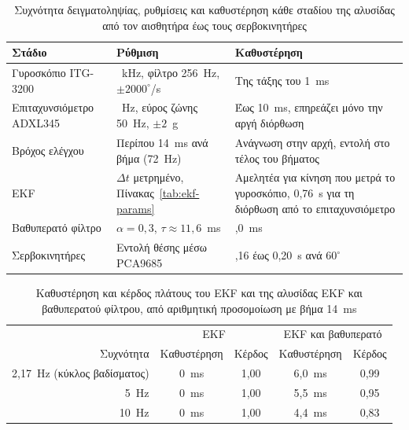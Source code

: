\documentclass[11pt]{report}
\begin{document}
\begin{table}[htbp]
    \centering
    \small
    \begin{tabular}{@{}>{\raggedright\arraybackslash}p{3.0cm}
                        >{\raggedright\arraybackslash}p{5.4cm}
                        >{\raggedright\arraybackslash}p{5.0cm}@{}}
        \toprule
        Στάδιο & Ρύθμιση & Καθυστέρηση \\
        \midrule
        Γυροσκόπιο ITG-3200 & 8~kHz, φίλτρο 256~Hz, $\pm 2000^\circ$/s & Της τάξης του 1~ms \\
        Επιταχυνσιόμετρο ADXL345 & 100~Hz, εύρος ζώνης 50~Hz, $\pm 2$~g & Έως 10~ms, επηρεάζει μόνο την αργή διόρθωση \\
        Βρόχος ελέγχου & Περίπου 14~ms ανά βήμα (72~Hz) & Ανάγνωση στην αρχή, εντολή στο τέλος του βήματος \\
        EKF & $\Delta t$ μετρημένο, Πίνακας~\ref{tab:ekf-params} & Αμελητέα για κίνηση που μετρά το γυροσκόπιο, 0,76~s για τη διόρθωση από το επιταχυνσιόμετρο \\
        Βαθυπερατό φίλτρο & $\alpha = 0{,}3$, $\tau \approx 11{,}6$~ms & 6,0~ms \\
        Σερβοκινητήρες & Εντολή θέσης μέσω PCA9685 & 0,16 έως 0,20~s ανά $60^\circ$ \\
        \bottomrule
    \end{tabular}
    \caption[Δειγματοληψία και καθυστέρηση ανά στάδιο]{Συχνότητα
    δειγματοληψίας, ρυθμίσεις και καθυστέρηση κάθε σταδίου της αλυσίδας από τον
    αισθητήρα έως τους σερβοκινητήρες}
    \label{tab:sensor-latency}
\end{table}

\begin{table}[htbp]
    \centering
    \small
    \begin{tabular}{@{}r c c c c@{}}
        \toprule
        & \multicolumn{2}{c}{EKF} & \multicolumn{2}{c}{EKF και βαθυπερατό} \\
        Συχνότητα & Καθυστέρηση & Κέρδος & Καθυστέρηση & Κέρδος \\
        \midrule
        2,17~Hz (κύκλος βαδίσματος) & 0~ms & 1,00 & 6,0~ms & 0,99 \\
        5~Hz & 0~ms & 1,00 & 5,5~ms & 0,95 \\
        10~Hz & 0~ms & 1,00 & 4,4~ms & 0,83 \\
        \bottomrule
    \end{tabular}
    \caption[Καθυστέρηση και κέρδος της αλυσίδας φιλτραρίσματος]{Καθυστέρηση
    και κέρδος πλάτους του EKF και της αλυσίδας EKF και βαθυπερατού φίλτρου, από
    αριθμητική προσομοίωση με βήμα 14~ms}
    \label{tab:filter-delay}
\end{table}
\end{document}

